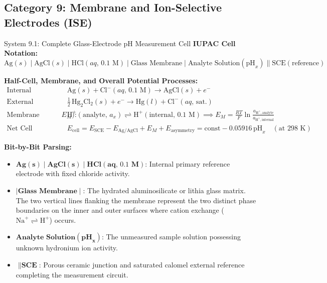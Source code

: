 \documentclass[10pt,a4paper]{article}
\begin{document}
\subsection{Category 9: Membrane and Ion-Selective Electrodes (ISE)}
\begin{examplebox}{System 9.1: Complete Glass-Electrode pH Measurement Cell}
\textbf{IUPAC Cell Notation:}
\begin{equation*}
    \text{Ag}(s) \mid \text{AgCl}(s) \mid \text{HCl}(aq,\, 0.1\text{ M}) \mid \text{Glass Membrane} \mid \text{Analyte Solution}(\text{pH}_x) \parallel \text{SCE}(\text{reference})
\end{equation*}

\textbf{Half-Cell, Membrane, and Overall Potential Processes:}
\begin{align*}
    \text{Internal Reference (Anode):} \quad & \text{Ag}(s) + \text{Cl}^-(aq,\, 0.1\text{ M}) \longrightarrow \text{AgCl}(s) + e^- \\
    \text{External Reference (Cathode):} \quad & \tfrac{1}{2}\,\text{Hg}_2\text{Cl}_2(s) + e^- \longrightarrow \text{Hg}(l) + \text{Cl}^-(aq,\, \text{sat.}) \\
    \text{Membrane Boundary Potential ($E_M$):} \quad & \text{H}^+(\text{analyte},\, a_x) \rightleftharpoons \text{H}^+(\text{internal},\, 0.1\text{ M}) \implies E_M = \frac{RT}{F}\ln\frac{a_{\text{H}^+,\text{analyte}}}{a_{\text{H}^+,\text{internal}}} \\
    \text{Net Cell Potential:} \quad & E_{\text{cell}} = E_{\text{SCE}} - E_{\text{Ag/AgCl}} + E_M + E_{\text{asymmetry}} = \text{const} - 0.05916\,\text{pH}_x \quad (\text{at } 298\text{ K})
\end{align*}

\textbf{Bit-by-Bit Parsing:}
\begin{itemize}[leftmargin=*]
    \item $\mathbf{Ag(s) \mid AgCl(s) \mid HCl(aq,\, 0.1\text{ M})}$: Internal primary reference electrode with fixed chloride activity.
    \item $\mathbf{\mid \text{Glass Membrane} \mid}$: The hydrated aluminosilicate or lithia glass matrix. The two vertical lines flanking the membrane represent the two distinct phase boundaries on the inner and outer surfaces where cation exchange ($\text{Na}^+ \rightleftharpoons \text{H}^+$) occurs.
    \item $\mathbf{\text{Analyte Solution}(\text{pH}_x)}$: The unmeasured sample solution possessing unknown hydronium ion activity.
    \item $\mathbf{\parallel \text{SCE}}$: Porous ceramic junction and saturated calomel external reference completing the measurement circuit.
\end{itemize}
\end{examplebox}
\end{document}
